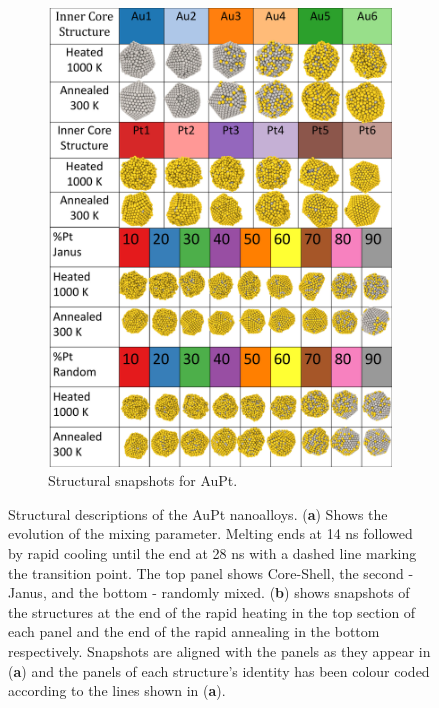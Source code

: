 \begin{figure}
\begin{subfigure}{0.39\textwidth}
    \label{fig:AuPtMix}
\end{subfigure}
\begin{subfigure}{0.56\textwidth}
    \includegraphics[width=\linewidth]{figures/MD/Alloys/AuPt_Struts.pdf}
    \caption{Structural snapshots for AuPt.}
    \label{fig:AuPt_Struts}
\end{subfigure}
    \caption{Structural descriptions of the AuPt nanoalloys. (\textbf{a}) Shows the evolution of the mixing parameter. Melting ends at 14 ns followed by rapid cooling until the end at 28 ns with a dashed line marking the transition point. The top panel shows Core-Shell, the second - Janus, and the bottom - randomly mixed. (\textbf{b}) shows snapshots of the structures at the end of the rapid heating in the top section of each panel and the end of the rapid annealing in the bottom respectively. Snapshots are aligned with the panels as they appear in (\textbf{a}) and the panels of each structure's identity has been colour coded according to the lines shown in (\textbf{a}).}
    \label{fig:AuPt_NA}
\end{figure}


